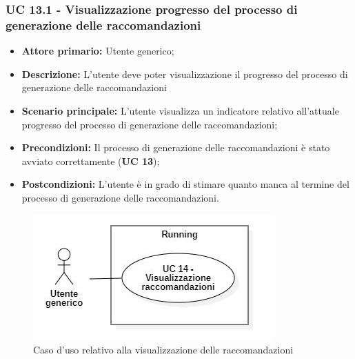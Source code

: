 \subsubsection{UC 13.1 - Visualizzazione progresso del processo di generazione delle raccomandazioni}
\begin{itemize}
	\item \textbf{Attore primario:} Utente generico;
	\item \textbf{Descrizione:} L'utente deve poter visualizzazione il progresso del processo di generazione delle raccomandazioni
	\item \textbf{Scenario principale:} L'utente visualizza un indicatore relativo all'attuale progresso del processo di generazione delle raccomandazioni;
	\item \textbf{Precondizioni:} Il processo di generazione delle raccomandazioni è stato avviato correttamente (\textbf{UC 13});
	\item \textbf{Postcondizioni:} L'utente è in grado di stimare quanto manca al termine del processo di generazione delle raccomandazioni.
\end{itemize}

\begin{figure}[H]
    \centering
    \includegraphics[scale=0.6]{immagini/usecase/cd9.JPG}
    \caption{Caso d'uso relativo alla visualizzazione delle raccomandazioni}
\end{figure}

